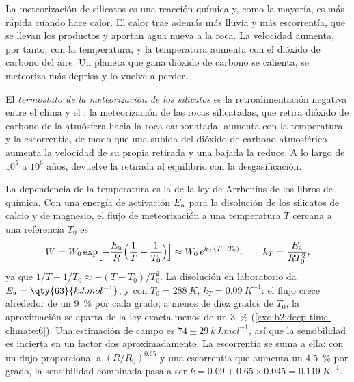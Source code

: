 La meteorización de silicatos es una reacción química y, como la mayoría, es más rápida cuando hace calor. El calor
trae además más lluvia y más escorrentía, que se llevan los productos y aportan agua nueva a la
roca. La velocidad aumenta, por tanto, con la temperatura; y la temperatura aumenta con el dióxido de carbono del
aire. Un planeta que gana dióxido de carbono se calienta, se meteoriza más deprisa y lo vuelve a perder.

\begin{definition}\label{def:b2:deep-time-climate:thermostat}
El \emph{termostato de la meteorización de los silicatos} es la retroalimentación
negativa entre el clima y el : la meteorización de las rocas silicatadas, que
retira dióxido de carbono de la atmósfera hacia la roca carbonatada, aumenta con la temperatura y la
escorrentía, de modo que una subida del dióxido de carbono atmosférico aumenta la velocidad de su propia retirada y una
bajada la reduce. A lo largo de $10^5$ a $10^6$ años, devuelve la retirada al equilibrio con la
desgasificación.
\end{definition}

La dependencia de la temperatura es la de la ley de Arrhenius de los libros de química. Con una energía de
activación $E_{\text a}$ para la disolución de los silicatos de calcio y de magnesio, el flujo de meteorización a
una temperatura $T$ cercana a una referencia $T_0$ es
\[
  W = W_0 \exp\Bigl[-\frac{E_{\text a}}{R}\Bigl(\frac1T - \frac1{T_0}\Bigr)\Bigr]
  \approx W_0\, e^{k_T (T - T_0)}, \qquad k_T = \frac{E_{\text a}}{R T_0^2},
\]
ya que $1/T - 1/T_0 \approx -(T - T_0)/T_0^2$. La disolución en laboratorio da $E_{\text a} =
\qty{63}{kJ.mol^{-1}}$, y con $T_0 = \qty{288}{K}$, $k_T = \qty{0.09}{K^{-1}}$: el flujo crece
alrededor de un \qty{9}{\percent} por cada grado; a menos de diez grados de $T_0$, la aproximación se aparta
de la ley exacta menos de un \qty{3}{\percent} (\cref{exo:b2:deep-time-climate:6}). Una estimación de campo es
$74 \pm \qty{29}{kJ.mol^{-1}}$, así que la sensibilidad es incierta en un factor dos aproximadamente. La escorrentía
se suma a ella: con un flujo proporcional a $(R/R_0)^{0.65}$ y una escorrentía que aumenta un
\qty{4.5}{\percent} por grado, la sensibilidad combinada pasa a ser $k = 0.09 + 0.65\times0.045 =
\qty{0.119}{K^{-1}}$.

